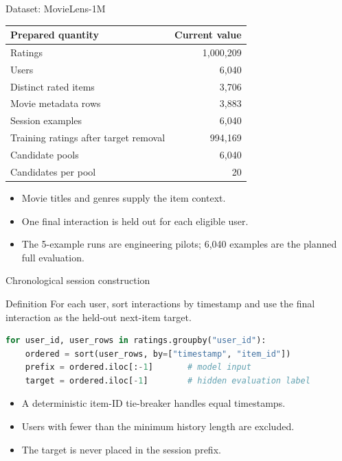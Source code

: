 \documentclass[aspectratio=169,12pt]{beamer}
\begin{document}
\begin{frame}{Dataset: MovieLens-1M}
\begin{table}
\centering
\small
\begin{tabular}{lr}
\toprule
\textbf{Prepared quantity} & \textbf{Current value}\\
\midrule
Ratings & 1,000,209\\
Users & 6,040\\
Distinct rated items & 3,706\\
Movie metadata rows & 3,883\\
Session examples & 6,040\\
Training ratings after target removal & 994,169\\
Candidate pools & 6,040\\
Candidates per pool & 20\\
\bottomrule
\end{tabular}
\end{table}

\begin{itemize}
  \item Movie titles and genres supply the item context.
  \item One final interaction is held out for each eligible user.
  \item The 5-example runs are engineering pilots; 6,040 examples are the
        planned full evaluation.
\end{itemize}
\end{frame}

\begin{frame}[fragile]{Chronological session construction}
\begin{block}{Definition}
For each user, sort interactions by timestamp and use the final interaction as
the held-out next-item target.
\end{block}

\begin{lstlisting}[language=Python]
for user_id, user_rows in ratings.groupby("user_id"):
    ordered = sort(user_rows, by=["timestamp", "item_id"])
    prefix = ordered.iloc[:-1]       # model input
    target = ordered.iloc[-1]        # hidden evaluation label
\end{lstlisting}

\begin{itemize}
  \item A deterministic item-ID tie-breaker handles equal timestamps.
  \item Users with fewer than the minimum history length are excluded.
  \item The target is never placed in the session prefix.
\end{itemize}
\end{frame}
\end{document}
